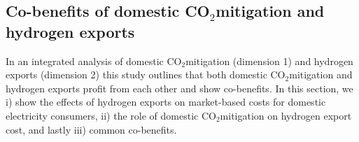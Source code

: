 \documentclass[5p,numafflabel]{elsarticle}
\newcommand{\co}{\ce{CO2}~}
\def\co{CO${}_2${\:}}
\begin{document}
\subsection*{Co-benefits of domestic \co mitigation and hydrogen exports}
\label{subsec:benefits}

In an integrated analysis of domestic \co mitigation (dimension 1) and hydrogen exports (dimension 2) this study outlines that both domestic \co mitigation and hydrogen exports profit from each other and show co-benefits. In this section, we i) show the effects of hydrogen exports on market-based costs for domestic electricity consumers, ii) the role of domestic \co mitigation on hydrogen export cost, and lastly iii) common co-benefits.
\end{document}
